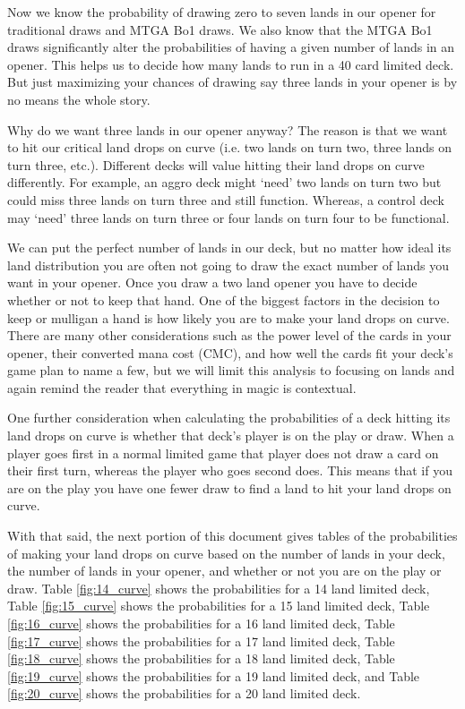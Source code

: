 \documentclass[oneside]{book}   %
\begin{document}
Now we know the probability of drawing zero to seven lands in our opener for traditional draws and MTGA Bo1 draws. We also know that the MTGA Bo1 draws significantly alter the probabilities of having a given number of lands in an opener. This helps us to decide how many lands to run in a 40 card limited deck. But just maximizing your chances of drawing say three lands in your opener is by no means the whole story. 

Why do we want three lands in our opener anyway? The reason is that we want to hit our critical land drops on curve (i.e. two lands on turn two, three lands on turn three, etc.). Different decks will value hitting their land drops on curve differently. For example, an aggro deck might `need' two lands on turn two but could miss three lands on turn three and still function. Whereas, a control deck may `need' three lands on turn three or four lands on turn four to be functional. 

We can put the perfect number of lands in our deck, but no matter how ideal its land distribution you are often not going to draw the exact number of lands you want in your opener. Once you draw a two land opener you have to decide whether or not to keep that hand. One of the biggest factors in the decision to keep or mulligan a hand is how likely you are to make your land drops on curve. There are many other considerations such as the power level of the cards in your opener, their converted mana cost (CMC), and how well the cards fit your deck's game plan to name a few, but we will limit this analysis to focusing on lands and again remind the reader that everything in magic is contextual.

One further consideration when calculating the probabilities of a deck hitting its land drops on curve is whether that deck's player is on the play or draw. When a player goes first in a normal limited game that player does not draw a card on their first turn, whereas the player who goes second does. This means that if you are on the play you have one fewer draw to find a land to hit your land drops on curve. 

With that said, the next portion of this document gives tables of the probabilities of making your land drops on curve based on the number of lands in your deck, the number of lands in your opener, and whether or not you are on the play or draw. Table \ref{fig:14_curve} shows the probabilities for a 14 land limited deck, Table \ref{fig:15_curve} shows the probabilities for a 15 land limited deck, Table \ref{fig:16_curve} shows the probabilities for a 16 land limited deck, Table \ref{fig:17_curve} shows the probabilities for a 17 land limited deck, Table \ref{fig:18_curve} shows the probabilities for a 18 land limited deck, Table \ref{fig:19_curve} shows the probabilities for a 19 land limited deck, and Table \ref{fig:20_curve} shows the probabilities for a 20 land limited deck. 
\end{document}
